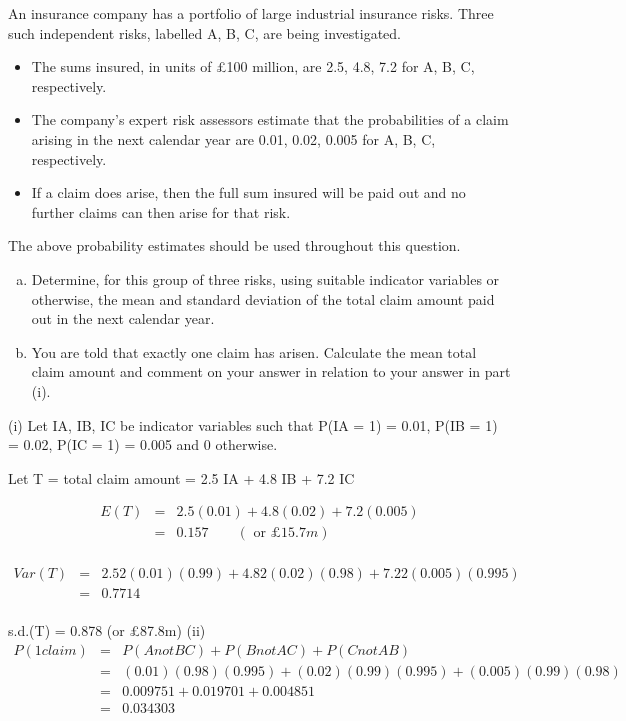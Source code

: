 \documentclass[a4paper,12pt]{article}
\begin{document}
An insurance company has a portfolio of large industrial insurance risks. Three such
independent risks, labelled A, B, C, are being investigated.
\begin{itemize}
    \item The sums insured, in units
of £100 million, are 2.5, 4.8, 7.2 for A, B, C, respectively.
\item The company's expert risk
assessors estimate that the probabilities of a claim arising in the next calendar year are
0.01, 0.02, 0.005 for A, B, C, respectively. 
\item If a claim does arise, then the full sum
insured will be paid out and no further claims can then arise for that risk. 
\end{itemize}
The above
probability estimates should be used throughout this question.
\begin{enumerate}[(a)]
\item  Determine, for this group of three risks, using suitable indicator variables or
otherwise, the mean and standard deviation of the total claim amount paid out
in the next calendar year.
\item You are told that exactly one claim has arisen. Calculate the mean total claim
amount and comment on your answer in relation to your answer in part (i).
\end{enumerate}

 (i) Let IA, IB, IC be indicator variables such that
P(IA = 1) = 0.01, P(IB = 1) = 0.02, P(IC = 1) = 0.005 and 0 otherwise.

Let T = total claim amount = 2.5 IA + 4.8 IB + 7.2 IC

\begin{eqnarray*}
E(T) &=& 2.5(0.01) + 4.8(0.02) + 7.2(0.005) \\ 
&=& 0.157 \qquad (\mbox{ or } £15.7m) \\
\end{eqnarray*}


\begin{eqnarray*}
Var(T) &=& 2.52(0.01)(0.99) + 4.82(0.02)(0.98) + 7.22(0.005)(0.995)\\ &=& 0.7714\\
\end{eqnarray*}

s.d.(T) = 0.878 (or £87.8m)
(ii) 
\begin{eqnarray*}
P(1 claim) &=& P(A not BC) + P(B not AC) + P(C not AB)\\
&=& (0.01)(0.98)(0.995) + (0.02)(0.99)(0.995) + (0.005)(0.99)(0.98)\\
&=& 0.009751 + 0.019701 + 0.004851 \\
&=& 0.034303\\
\end{eqnarray*}
\end{document}
